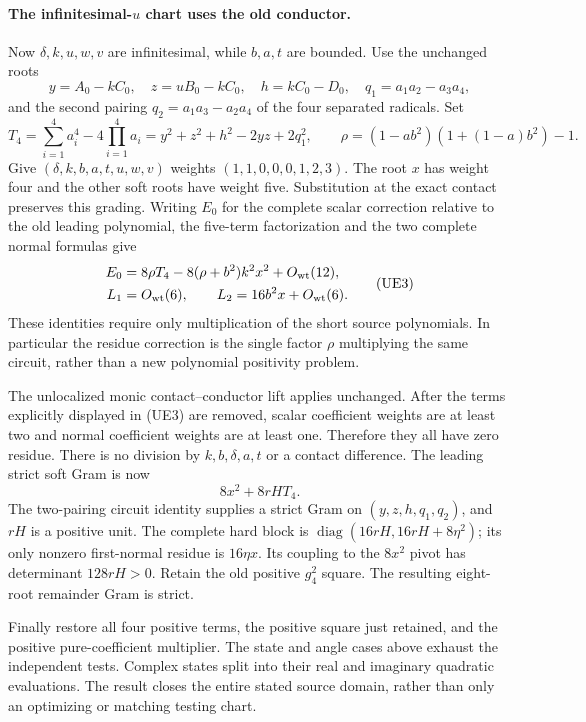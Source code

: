 \paragraph{The infinitesimal-$u$ chart uses the old conductor.}
Now $\delta,k,u,w,v$ are infinitesimal, while $b,a,t$ are bounded.
Use the unchanged roots
\[
 y=A_0-kC_0,\quad z=uB_0-kC_0,\quad h=kC_0-D_0,
 \quad q_1=a_1a_2-a_3a_4,
\]
and the second pairing $q_2=a_1a_3-a_2a_4$ of the four separated
radicals. Set
\[
 T_4=\sum_{i=1}^4a_i^4-4\prod_{i=1}^4a_i
     =y^2+z^2+h^2-2yz+2q_1^2,
 \qquad \rho=(1-ab^2)(1+(1-a)b^2)-1.
\]
Give $(\delta,k,b,a,t,u,w,v)$ weights $(1,1,0,0,0,1,2,3)$.
The root $x$ has weight four and the other soft roots have weight
five. Substitution at the exact contact preserves this grading.
Writing $E_0$ for the complete scalar correction relative to the
old leading polynomial, the five-term factorization and the two
complete normal formulas give
\[
 \begin{aligned}
 E_0&=8\rho T_4-8(\rho+b^2)k^2x^2+O_{\rm wt}(12),\\
 L_1&=O_{\rm wt}(6),\qquad
 L_2=16b^2x+O_{\rm wt}(6).
 \end{aligned}\tag{UE3}
\]
These identities require only multiplication of the short source
polynomials. In particular the residue correction is the single
factor $\rho$ multiplying the same circuit, rather than a new
polynomial positivity problem.

The unlocalized monic contact--conductor lift applies unchanged.
After the terms explicitly displayed in (UE3) are removed, scalar
coefficient weights are at least two and normal coefficient weights
are at least one. Therefore they all have zero residue. There is no
division by $k,b,\delta,a,t$ or a contact difference. The leading
strict soft Gram is now
\[
                  8x^2+8rH T_4.
\]
The two-pairing circuit identity supplies a strict Gram on
$(y,z,h,q_1,q_2)$, and $rH$ is a positive unit. The complete hard
block is $\operatorname{diag}(16rH,16rH+8\eta^2)$; its only
nonzero first-normal residue is $16\eta x$. Its coupling to the
$8x^2$ pivot has determinant $128rH>0$. Retain the old positive
$g_4^2$ square. The resulting eight-root remainder Gram is strict.

Finally restore all four positive terms, the positive square just
retained, and the positive pure-coefficient multiplier. The state and
angle cases above exhaust the independent tests. Complex states split
into their real and imaginary quadratic evaluations. The result
closes the entire stated source domain, rather than only an optimizing
or matching testing chart.




